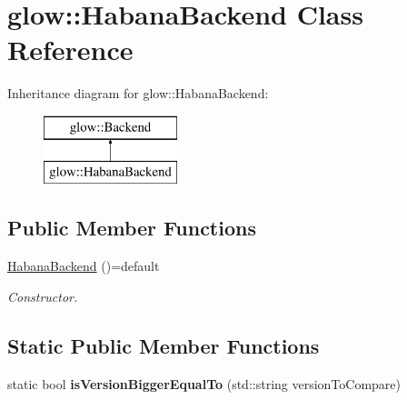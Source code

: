 \hypertarget{classglow_1_1_habana_backend}{}\section{glow\+:\+:Habana\+Backend Class Reference}
\label{classglow_1_1_habana_backend}
Inheritance diagram for glow\+:\+:Habana\+Backend\+:\begin{figure}[H]
\begin{center}
\leavevmode
\includegraphics[height=2.000000cm]{classglow_1_1_habana_backend}
\end{center}
\end{figure}
\subsection*{Public Member Functions}
\begin{DoxyCompactItemize}
\item 
\mbox{\label{classglow_1_1_habana_backend_af98b56680c9b726f60320fc24080237c}} 
\hyperlink{classglow_1_1_habana_backend_af98b56680c9b726f60320fc24080237c}{Habana\+Backend} ()=default
\begin{DoxyCompactList}\small\item\em Constructor. \end{DoxyCompactList}\end{DoxyCompactItemize}
\subsection*{Static Public Member Functions}
\begin{DoxyCompactItemize}
\item 
\mbox{\label{classglow_1_1_habana_backend_a38324f01e7296f09b0854296ad06926b}} 
static bool {\bfseries is\+Version\+Bigger\+Equal\+To} (std\+::string version\+To\+Compare)
\end{DoxyCompactItemize}
